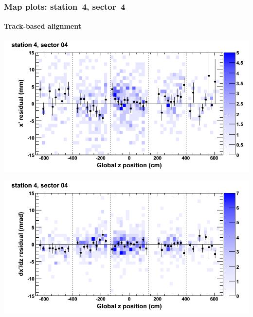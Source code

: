 \documentclass[compress]{beamer}
\begin{document}
\begin{frame}
\frametitle{Map plots: station~4, sector~4}
\framesubtitle{Track-based alignment}
\includegraphics[width=0.5\linewidth]{mapplots_re05/DTvsz_st4sec04_x.png}

\includegraphics[width=0.5\linewidth]{mapplots_re05/DTvsz_st4sec04_dxdz.png}
\end{frame}
\end{document}
